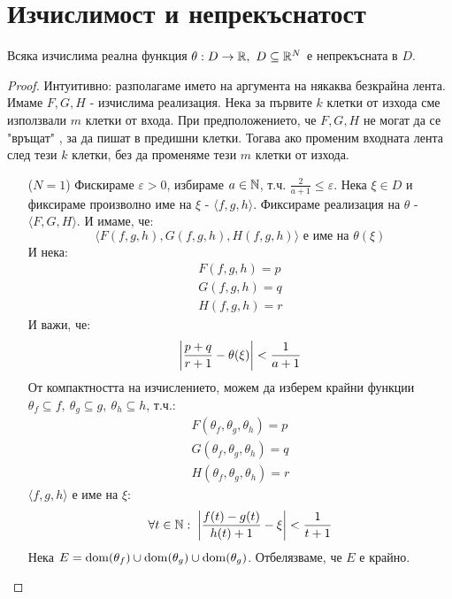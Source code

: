 \section{Изчислимост и непрекъснатост}
\begin{theorem}
    Всяка изчислима реална функция $\theta : D \to {\mathbb{R}},\ D \subseteq {\mathbb{R}}^N$ е непрекъсната в $D$.  
\end{theorem}
\begin{proof}
    Интуитивно: разполагаме името на аргумента на някаква безкрайна лента. Имаме $F, G, H$ - изчислима реализация. Нека за първите $k$ клетки от изхода сме използвали $m$ клетки от входа. При предположението, че $F, G, H$ не могат да се "връщат" , за да пишат в предишни клетки. Тогава ако променим входната лента след тези $k$ клетки, без да променяме тези $m$ клетки от изхода.

    \begin{itemize}
        \item[($N=1$)] Фискираме $\varepsilon > 0$, избираме $a \in {\mathbb{N}}$, т.ч. $\frac{2}{a+1} \leq \varepsilon$. Нека $\xi \in D$ и фиксираме произволно име на $\xi$ - $\langle f, g, h\rangle$. Фиксираме реализация на $\theta$ - $\langle F, G, H \rangle$. И имаме, че:
        \begin{equation}
            \langle F(f,g,h), G(f,g,h), H(f,g,h) \rangle \text{ е име на } \theta(\xi)
        \end{equation}
        И нека:
        \begin{equation}
            \begin{split}
                F(f,g,h) = p \\
                G(f,g,h) = q \\
                H(f,g,h) = r
            \end{split}
        \end{equation}
        И важи, че:
        \begin{equation}
            \left|\frac{p+q}{r+1} - \theta(\xi)\right| < \frac{1}{a+1}
        \end{equation}
        От компактността на изчислението, можем да изберем крайни функции $\theta_f \subseteq f,\ \theta_g \subseteq g,\ \theta_h \subseteq h$, т.ч.:
        \begin{equation}
            \begin{split}
                F(\theta_f, \theta_g, \theta_h) = p \\
                G(\theta_f, \theta_g, \theta_h) = q \\
                H(\theta_f, \theta_g, \theta_h) = r
            \end{split}
        \end{equation}
        $\langle f, g, h\rangle$ е име на $\xi$:
        \begin{equation}
            \forall t \in {\mathbb{N}}:\; \left|\frac{f(t) - g(t)}{h(t) + 1} - \xi\right| < \frac{1}{t+1}
        \end{equation}
        Нека $E = \operatorname*{dom}(\theta_f) \cup \operatorname*{dom}(\theta_g) \cup \operatorname*{dom}(\theta_g)$. Отбелязваме, че $E$ е крайно.


\end{itemize}
\end{proof}
